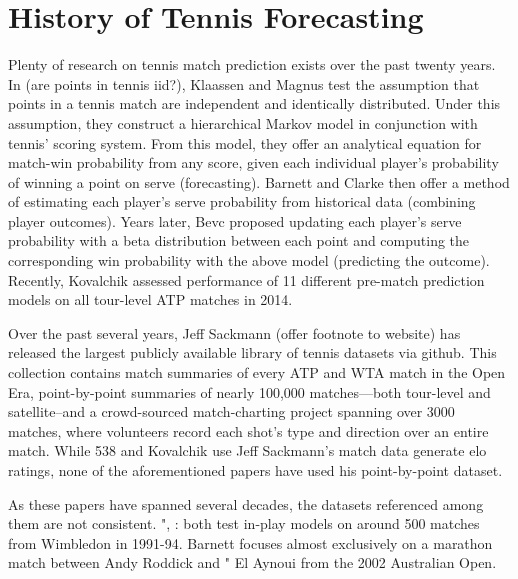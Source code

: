 \documentclass[chapterprefix=false]{report}
\begin{document}


\section{History of Tennis Forecasting}
Plenty of research on tennis match prediction exists over the past twenty years. In (are points in tennis iid?), Klaassen and Magnus test the assumption that points in a tennis match are independent and identically distributed. Under this assumption, they construct a hierarchical Markov model in conjunction with tennis’ scoring system. From this model, they offer an analytical equation for match-win probability from any score, given each individual player’s probability of winning a point on serve (forecasting).  Barnett and Clarke then offer a method of estimating each player’s serve probability from historical data (combining player outcomes). Years later, Bevc proposed updating each player’s serve probability with a beta distribution between each point and computing the corresponding win probability with the above model (predicting the outcome). Recently, Kovalchik assessed performance of 11 different pre-match prediction models on all tour-level ATP matches in 2014.

Over the past several years, Jeff Sackmann (offer footnote to website) has released the largest publicly available library of tennis datasets via github. This collection contains match summaries of every ATP and WTA match in the Open Era, point-by-point summaries of nearly 100,000 matches—both tour-level and satellite--and a crowd-sourced match-charting project spanning over 3000 matches, where volunteers record each shot’s type and direction over an entire match. While 538 and Kovalchik use Jeff Sackmann’s match data generate elo ratings, none of the aforementioned papers have used his point-by-point dataset.

As these papers have spanned several decades, the datasets referenced among them are not consistent. ", : both test in-play models on around 500 matches from Wimbledon in 1991-94. Barnett focuses almost exclusively on a marathon match between Andy Roddick and " El Aynoui from the 2002 Australian Open. 
\end{document}

